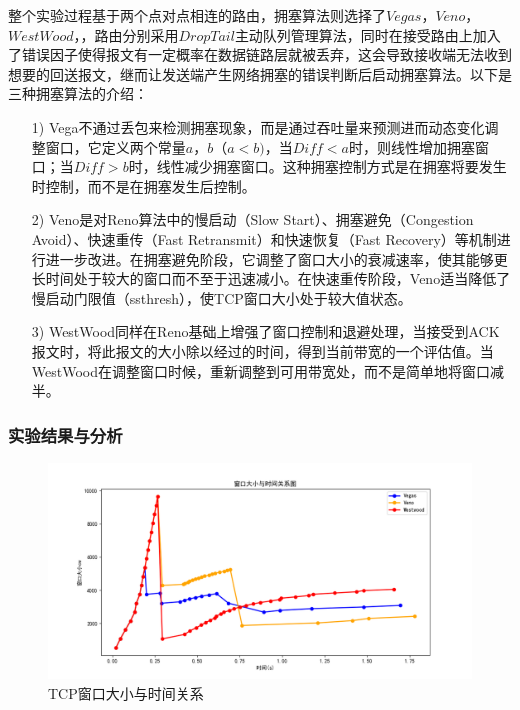 \documentclass{article}
\begin{document}
整个实验过程基于两个点对点相连的路由，拥塞算法则选择了$Vegas$，$Veno$，$WestWood$，，路由分别采用$DropTail$主动队列管理算法，同时在接受路由上加入了错误因子使得报文有一定概率在数据链路层就被丢弃，这会导致接收端无法收到想要的回送报文，继而让发送端产生网络拥塞的错误判断后启动拥塞算法。以下是三种拥塞算法的介绍：

\begin{itemize}
	\setlength{\itemsep}{0pt}
	\setlength{\parsep}{0pt}
	\setlength{\parskip}{0pt}
	\item [1)]Vega不通过丢包来检测拥塞现象，而是通过吞吐量来预测进而动态变化调整窗口，它定义两个常量$a，b（a<b)$，当$Diff< a$时，则线性增加拥塞窗口；当$Diff> b$时，线性减少拥塞窗口。这种拥塞控制方式是在拥塞将要发生时控制，而不是在拥塞发生后控制。
	\item [2)]Veno是对Reno算法中的慢启动（Slow Start）、拥塞避免（Congestion Avoid）、快速重传（Fast Retransmit）和快速恢复（Fast Recovery）等机制进行进一步改进。在拥塞避免阶段，它调整了窗口大小的衰减速率，使其能够更长时间处于较大的窗口而不至于迅速减小。在快速重传阶段，Veno适当降低了慢启动门限值（ssthresh），使TCP窗口大小处于较大值状态。
	\item [3)]WestWood同样在Reno基础上增强了窗口控制和退避处理，当接受到ACK报文时，将此报文的大小除以经过的时间，得到当前带宽的一个评估值。当WestWood在调整窗口时候，重新调整到可用带宽处，而不是简单地将窗口减半。
\end{itemize}

\subsubsection{实验结果与分析}

\begin{figure}[H]
	\centering
	\includegraphics[scale=0.6]{picture/cwTcp.png}
	\caption{TCP窗口大小与时间关系}
	\label{fig:cWTCP}
\end{figure}
\end{document}
